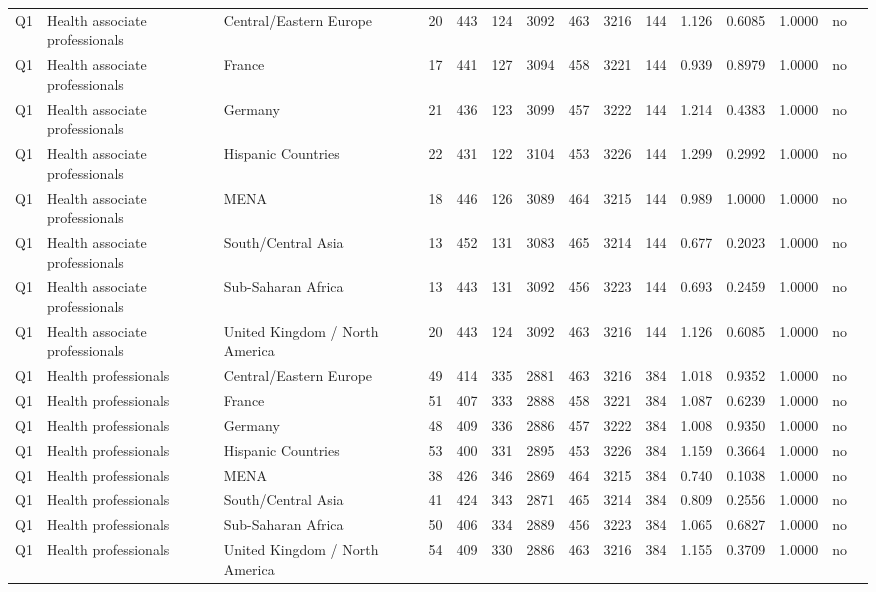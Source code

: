 \begin{longtable}{lllrcccccccccll}
Q1 & Health associate professionals & Central/Eastern Europe & 20 & 443 & 124 & 3092 & 463 & 3216 & 144 & 1.126 & 0.6085 & 1.0000 & no \\
Q1 & Health associate professionals & France & 17 & 441 & 127 & 3094 & 458 & 3221 & 144 & 0.939 & 0.8979 & 1.0000 & no \\
Q1 & Health associate professionals & Germany & 21 & 436 & 123 & 3099 & 457 & 3222 & 144 & 1.214 & 0.4383 & 1.0000 & no \\
Q1 & Health associate professionals & Hispanic Countries & 22 & 431 & 122 & 3104 & 453 & 3226 & 144 & 1.299 & 0.2992 & 1.0000 & no \\
Q1 & Health associate professionals & MENA & 18 & 446 & 126 & 3089 & 464 & 3215 & 144 & 0.989 & 1.0000 & 1.0000 & no \\
Q1 & Health associate professionals & South/Central Asia & 13 & 452 & 131 & 3083 & 465 & 3214 & 144 & 0.677 & 0.2023 & 1.0000 & no \\
Q1 & Health associate professionals & Sub-Saharan Africa & 13 & 443 & 131 & 3092 & 456 & 3223 & 144 & 0.693 & 0.2459 & 1.0000 & no \\
Q1 & Health associate professionals & United Kingdom / North America & 20 & 443 & 124 & 3092 & 463 & 3216 & 144 & 1.126 & 0.6085 & 1.0000 & no \\
Q1 & Health professionals & Central/Eastern Europe & 49 & 414 & 335 & 2881 & 463 & 3216 & 384 & 1.018 & 0.9352 & 1.0000 & no \\
Q1 & Health professionals & France & 51 & 407 & 333 & 2888 & 458 & 3221 & 384 & 1.087 & 0.6239 & 1.0000 & no \\
Q1 & Health professionals & Germany & 48 & 409 & 336 & 2886 & 457 & 3222 & 384 & 1.008 & 0.9350 & 1.0000 & no \\
Q1 & Health professionals & Hispanic Countries & 53 & 400 & 331 & 2895 & 453 & 3226 & 384 & 1.159 & 0.3664 & 1.0000 & no \\
Q1 & Health professionals & MENA & 38 & 426 & 346 & 2869 & 464 & 3215 & 384 & 0.740 & 0.1038 & 1.0000 & no \\
Q1 & Health professionals & South/Central Asia & 41 & 424 & 343 & 2871 & 465 & 3214 & 384 & 0.809 & 0.2556 & 1.0000 & no \\
Q1 & Health professionals & Sub-Saharan Africa & 50 & 406 & 334 & 2889 & 456 & 3223 & 384 & 1.065 & 0.6827 & 1.0000 & no \\
Q1 & Health professionals & United Kingdom / North America & 54 & 409 & 330 & 2886 & 463 & 3216 & 384 & 1.155 & 0.3709 & 1.0000 & no \\

\end{longtable}
